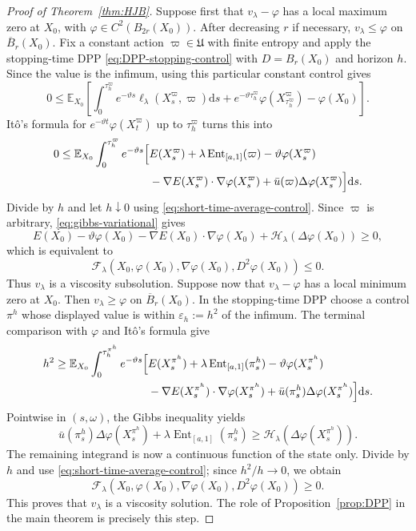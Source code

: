 \documentclass[11pt]{article}
\def\E{\mathbb{E}}
\def\Fc{{\mathcal F}}
\newcommand{\dd}{\mathrm{d}}
\newcommand{\Ent}{\operatorname{Ent}}
\theoremstyle{definition}
\theoremstyle{remark}
\numberwithin{equation}{section}
\begin{document}
\begin{proof}[Proof of Theorem~\ref{thm:HJB}]
Suppose first that $v_\lambda-\varphi$ has a local maximum zero at $X_0$, with
$\varphi\in C^2(B_{2r}(X_0))$.  After decreasing $r$ if necessary,
$v_\lambda\le\varphi$ on $\overline B_r(X_0)$.  Fix a constant action
$\varpi\in\mathfrak U$ with finite entropy and apply the stopping-time DPP
\eqref{eq:DPP-stopping-control} with $D=B_r(X_0)$ and horizon $h$.  Since the value is the infimum,
using this particular constant control gives
\[
 0\le\E_{X_0}\left[
 \int_0^{\tau_h^\varpi}e^{-\vartheta s}
 \ell_\lambda(X_s^\varpi,\varpi)\dd s
 +e^{-\vartheta\tau_h^\varpi}\varphi(X_{\tau_h^\varpi}^\varpi)
 -\varphi(X_0)\right].
\]
It\^o's formula for $e^{-\vartheta t}\varphi(X_t^\varpi)$ up to
$\tau_h^\varpi$ turns this into
\begin{align*}
 0\le\E_{X_0}\int_0^{\tau_h^\varpi}e^{-\vartheta s}
 \Bigl[&E(X_s^\varpi)+\lambda\Ent_{[a,1]}(\varpi)
 -\vartheta\varphi(X_s^\varpi)\\
 &-\nabla E(X_s^\varpi)\cdot\nabla\varphi(X_s^\varpi)
 +\bar u(\varpi)\Delta\varphi(X_s^\varpi)\Bigr]\dd s.
\end{align*}
Divide by $h$ and let $h\downarrow0$ using
\eqref{eq:short-time-average-control}.  Since $\varpi$ is arbitrary,
\eqref{eq:gibbs-variational} gives
\[
 E(X_0)-\vartheta\varphi(X_0)
 -\nabla E(X_0)\cdot\nabla\varphi(X_0)
 +\mathscr H_\lambda(\Delta\varphi(X_0))\ge0,
\]
which is equivalent to
\[
 \Fc_\lambda(X_0,\varphi(X_0),\nabla\varphi(X_0),D^2\varphi(X_0))\le0.
\]
Thus $v_\lambda$ is a viscosity subsolution.
Suppose now that $v_\lambda-\varphi$ has a local minimum zero at $X_0$.  Then
$v_\lambda\ge\varphi$ on $\overline B_r(X_0)$.  In the stopping-time DPP choose a control
$\pi^h$ whose displayed value is within $\varepsilon_h:=h^2$ of the infimum.  The terminal
comparison with $\varphi$ and It\^o's formula give
\begin{align*}
 h^2\ge\E_{X_0}\int_0^{\tau_h^{\pi^h}}e^{-\vartheta s}
 \Bigl[&E(X_s^{\pi^h})+\lambda\Ent_{[a,1]}(\pi_s^h)
 -\vartheta\varphi(X_s^{\pi^h})\\
 &-\nabla E(X_s^{\pi^h})\cdot\nabla\varphi(X_s^{\pi^h})
 +\bar u(\pi_s^h)\Delta\varphi(X_s^{\pi^h})\Bigr]\dd s.
\end{align*}
Pointwise in $(s,\omega)$, the Gibbs inequality yields
\[
 \bar u(\pi_s^h)\Delta\varphi(X_s^{\pi^h})
 +\lambda\Ent_{[a,1]}(\pi_s^h)
 \ge\mathscr H_\lambda(\Delta\varphi(X_s^{\pi^h})).
\]
The remaining integrand is now a continuous function of the state only.  Divide by $h$ and use
\eqref{eq:short-time-average-control}; since $h^2/h\to0$, we obtain
\[
 \Fc_\lambda(X_0,\varphi(X_0),\nabla\varphi(X_0),D^2\varphi(X_0))\ge0.
\]
This proves that $v_\lambda$ is a viscosity solution.  The role of
Proposition~\ref{prop:DPP} in the main theorem is precisely this step.


\end{proof}
\end{document}
